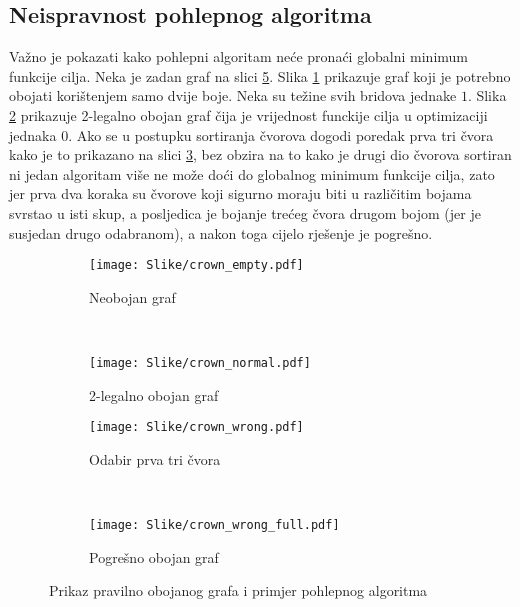 \documentclass[times, utf8, diplomski, numeric]{fer}
\begin{document}
\subsection{Neispravnost pohlepnog algoritma}

Važno je pokazati kako pohlepni algoritam neće pronaći globalni minimum funkcije cilja. Neka je zadan graf na slici \ref{fig:greedy_alg}.
Slika \ref{fig:crown_empty} prikazuje graf koji je potrebno obojati korištenjem samo dvije boje. Neka su težine svih bridova jednake $1$. Slika \ref{fig:crown_normal} prikazuje 2-legalno obojan graf čija je vrijednost funckije cilja u optimizaciji jednaka $0$. Ako se u postupku sortiranja čvorova dogodi poredak prva tri čvora kako je to prikazano na slici \ref{fig:crown_wrong}, bez obzira na to kako je drugi dio čvorova sortiran ni jedan algoritam više ne može doći do globalnog minimum funkcije cilja, zato jer prva dva koraka su čvorove koji sigurno moraju biti u različitim bojama svrstao u isti skup, a posljedica je bojanje trećeg čvora drugom bojom (jer je susjedan drugo odabranom), a nakon toga cijelo rješenje je pogrešno.


\begin{figure}
        \centering
        \begin{subfigure}[b]{0.33\textwidth}
                \texttt{[image: Slike/crown\_empty.pdf]}
                \caption{Neobojan graf}
                \label{fig:crown_empty}
        \end{subfigure}
        ~
        \begin{subfigure}[b]{0.33\textwidth}
                \texttt{[image: Slike/crown\_normal.pdf]}
                \caption{2-legalno obojan graf}
                \label{fig:crown_normal}
        \end{subfigure}
         
        \begin{subfigure}[b]{0.33\textwidth}
                \texttt{[image: Slike/crown\_wrong.pdf]}
                \caption{Odabir prva tri čvora}
                \label{fig:crown_wrong}
        \end{subfigure}
        ~
        \begin{subfigure}[b]{0.33\textwidth}
                \texttt{[image: Slike/crown\_wrong\_full.pdf]}
                \caption{Pogrešno obojan graf}
                \label{fig:crown_wrong_full}
        \end{subfigure}
        \caption{Prikaz pravilno obojanog grafa i primjer pohlepnog algoritma}
        \label{fig:greedy_alg}
\end{figure}
\end{document}
